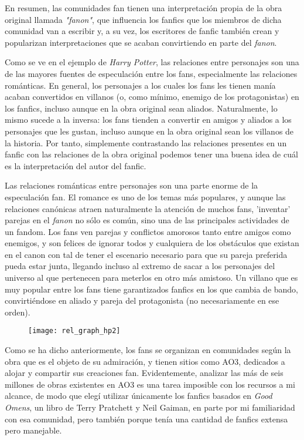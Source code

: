 \documentclass{pre-tfg}
\begin{document}
En resumen, las comunidades fan tienen una interpretación propia de la obra original llamada \textit{"fanon"}, que influencia los fanfics que los miembros de dicha comunidad van a escribir y, a su vez, los escritores de fanfic también crean y popularizan interpretaciones que se acaban convirtiendo en parte del \textit{fanon}.

Como se ve en el ejemplo de \textit{Harry Potter}, las relaciones entre personajes son una de las mayores fuentes de especulación entre los fans, especialmente las relaciones románticas. En general, los personajes a los cuales los fans les tienen manía acaban convertidos en villanos (o, como mínimo, enemigo de los protagonistas) en los fanfics, incluso aunque en la obra original sean aliados. Naturalmente, lo mismo sucede a la inversa: los fans tienden a convertir en amigos y aliados a los personajes que les gustan, incluso aunque en la obra original sean los villanos de la historia. Por tanto, simplemente contrastando las relaciones presentes en un fanfic con las relaciones de la obra original podemos tener una buena idea de cuál es la interpretación del autor del fanfic.

Las relaciones románticas entre personajes son una parte enorme de la especulación fan. El romance es uno de los temas más populares, y aunque las relaciones canónicas atraen naturalmente la atención de muchos fans, 'inventar' parejas en el \textit{fanon} no sólo es común, sino una de las principales actividades de un fandom. Los fans ven parejas y conflictos amorosos tanto entre amigos como enemigos, y son felices de ignorar todos y cualquiera de los obstáculos que existan en el canon con tal de tener el escenario necesario para que su pareja preferida pueda estar junta, llegando incluso al extremo de sacar a los personajes del universo al que pertenecen para meterlos en otro más amistoso. Un villano que es muy popular entre los fans tiene garantizados fanfics en los que cambia de bando, convirtiéndose en aliado y pareja del protagonista (no necesariamente en ese orden).

\begin{figure}
	\texttt{[image: rel\_graph\_hp2]}
	\label{fig:graph_hp}
	\centering
\end{figure}


Como se ha dicho anteriormente, los fans se organizan en comunidades según la obra que es el objeto de su admiración, y tienen sitios como AO3, dedicados a alojar y compartir sus creaciones fan. Evidentemente, analizar las más de seis millones de obras existentes en AO3 es una tarea imposible con los recursos a mi alcance, de modo que elegí utilizar únicamente los fanfics basados en \textit{Good Omens}, un libro de Terry Pratchett y Neil Gaiman, en parte por mi familiaridad con esa comunidad, pero también porque tenía una cantidad de fanfics extensa pero manejable.
\end{document}

